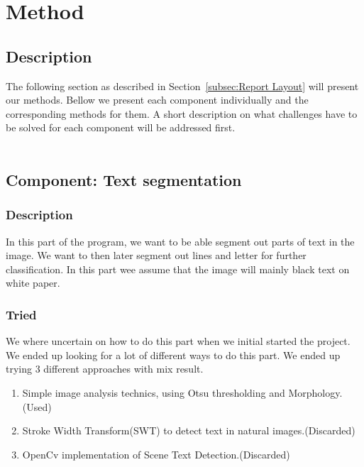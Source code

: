 \documentclass[11pt,a4paper,UKenglish]{report}
\begin{document}
\newpage
\chapter{Method}
\label{sec:Method}
\section{Description}
The following section as described in Section~\ref{subsec:Report Layout} will
present our methods. Bellow we present each component individually and the
corresponding methods for them. A short description on what challenges have to
be solved for each component will be addressed first. \\ \\


\section{Component: Text segmentation}
\label{Method:Text_segmentation}

\subsection{Description}
In this part of the program, we want to be able segment out parts of text in the image. We want to then later segment out lines and letter for further classification. In this part wee assume that the image will mainly black text on white paper.

\subsection{Tried}
We where uncertain on how to do this part when we initial started the project. We ended up looking for a lot of different ways to do this part. We ended up trying 3 different approaches with mix result.
\begin{enumerate}
  \item Simple image analysis technics, using Otsu thresholding and Morphology.(Used)
  \item Stroke Width Transform(SWT) to detect text in natural images.(Discarded)
  \item OpenCv implementation of Scene Text Detection.(Discarded)
\end{enumerate}
\end{document}
